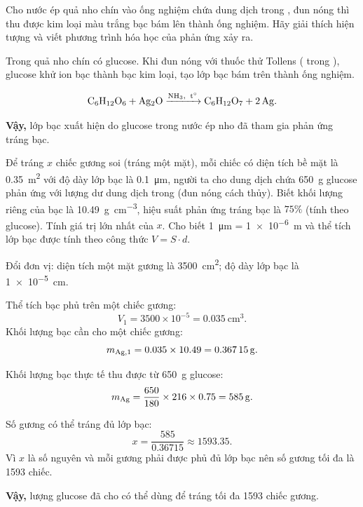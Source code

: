 \begin{tuluyen}
Cho nước ép quả nho chín vào ống nghiệm chứa dung dịch  trong , đun nóng thì thu được kim loại màu trắng bạc bám lên thành ống nghiệm. Hãy giải thích hiện tượng và viết phương trình hóa học của phản ứng xảy ra.
\begin{loigiaiBT}
Trong quả nho chín có glucose. Khi đun nóng với thuốc thử Tollens ( trong ), glucose khử ion bạc thành bạc kim loại, tạo lớp bạc bám trên thành ống nghiệm.

\[
\ce{C6H12O6 + Ag2O ->[NH3,\ t^\circ] C6H12O7 + 2Ag}.
\]

\textbf{Vậy,} lớp bạc xuất hiện do glucose trong nước ép nho đã tham gia phản ứng tráng bạc.
\end{loigiaiBT}
\end{tuluyen}

\begin{tuluyen}
Để tráng $x$ chiếc gương soi (tráng một mặt), mỗi chiếc có diện tích bề mặt là \SI{0.35}{\meter\squared} với độ dày lớp bạc là \SI{0.1}{\micro\meter}, người ta cho dung dịch chứa \SI{650}{\gram} glucose phản ứng với lượng dư dung dịch  trong  (đun nóng cách thủy). Biết khối lượng riêng của bạc là \SI{10.49}{\gram\per\centi\meter\cubed}, hiệu suất phản ứng tráng bạc là $75\%$ (tính theo glucose). Tính giá trị lớn nhất của $x$. Cho biết \SI{1}{\micro\meter} = \SI{1e-6}{\meter} và thể tích lớp bạc được tính theo công thức $V=S\cdot d$.
\begin{loigiaiBT}
Đổi đơn vị: diện tích một mặt gương là \SI{3500}{\centi\meter\squared}; độ dày lớp bạc là \SI{1e-5}{\centi\meter}.

Thể tích bạc phủ trên một chiếc gương:
\[
V_1=3500\times10^{-5}
=\SI{0.035}{\centi\meter\cubed}.
\]
Khối lượng bạc cần cho một chiếc gương:
\[
m_{\ce{Ag},1}=0.035\times10.49
=\SI{0.36715}{\gram}.
\]

Khối lượng bạc thực tế thu được từ \SI{650}{\gram} glucose:
\[
m_{\ce{Ag}}=\frac{650}{180}\times216\times0.75
=\SI{585}{\gram}.
\]

Số gương có thể tráng đủ lớp bạc:
\[
x=\frac{585}{0.36715}\approx1593.35.
\]
Vì $x$ là số nguyên và mỗi gương phải được phủ đủ lớp bạc nên số gương tối đa là 1593 chiếc.

\textbf{Vậy,} lượng glucose đã cho có thể dùng để tráng tối đa 1593 chiếc gương.
\end{loigiaiBT}
\end{tuluyen}

